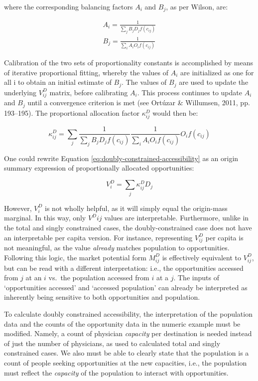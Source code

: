\documentclass[
11pt, %
oneside, %
english, %
singlespacing, %
]{macthesis} %
\begin{document}
\noindent where the corresponding balancing factors \(A_i\) and \(B_j\), as per Wilson, are:

\[
\begin{array}{l}
A_i = \frac{1}{\sum_j B_j D_j f(c_{ij})}\\
B_j = \frac{1}{\sum_i A_i O_i f(c_{ij})}
\end{array}
\]

Calibration of the two sets of proportionality constants is accomplished by means of iterative proportional fitting, whereby the values of \(A_i\) are initialized as one for all i to obtain an initial estimate of \(B_j\). The values of \(B_j\) are used to update the underlying \(V_{ij}^D\) matrix, before calibrating \(A_i\). This process continues to update \(A_i\) and \(B_j\) until a convergence criterion is met (see Ortúzar \& Willumsen, 2011, pp. 193--195). The proportional allocation factor \(\kappa_{ij}^D\) would then be:

\[
\kappa_{ij}^D = \sum_j \frac{1}{\sum_j B_j D_j f(c_{ij})} \frac{1}{\sum_i A_i O_i f(c_{ij})} O_i f(c_{ij})
\]

One could rewrite Equation \ref{eq:doubly-constrained-accessibility} as an origin summary expression of proportionally allocated opportunities:

\begin{equation}
\label{eq:doubly-constrained-accessibility-w-paf}
V^D_{i} = \sum_j \kappa^D_{ij}  D_j
\end{equation} 

However, \(V^D_{i}\) is not wholly helpful, as it will simply equal the origin-mass marginal. In this way, only \(V^D{ij}\) values are interpretable. Furthermore, unlike in the total and singly constrained cases, the doubly-constrained case does not have an interpretable per capita version. For instance, representing \(V_{ij}^D\) per capita is not meaningful, as the value \emph{already} matches population to opportunities. Following this logic, the market potential form \(M^D_{ij}\) is effectively equivalent to \(V_{ij}^D\), but can be read with a different interpretation: i.e., the opportunities accessed from \(j\) at an \(i\) vs.~the population accessed from \(i\) at a \(j\). The inputs of `opportunities accessed' and `accessed population' can already be interpreted as inherently being sensitive to both opportunities and population.

To calculate doubly constrained accessibility, the interpretation of the population data and the counts of the opportunity data in the numeric example must be modified. Namely, a count of physician \emph{capacity} per destination is needed instead of just the number of physicians, as used to calculated total and singly constrained cases. We also must be able to clearly state that the population is a count of people seeking opportunities at the new capacities, i.e., the population must reflect the \emph{capacity} of the population to interact with opportunities.
\end{document}
